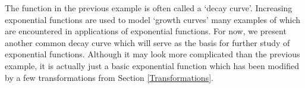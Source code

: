 \medskip

The function in the previous example is often called a `decay curve'.  Increasing exponential functions are used to model `growth curves' many examples of which are encountered in applications of exponential functions.  For now, we present another common decay curve which will serve as the basis for further study of exponential functions.  Although it may look more complicated than the previous example, it is actually just a basic exponential function which has been modified by a few transformations from Section \ref{Transformations}.

\medskip

